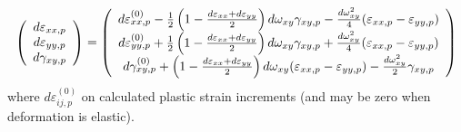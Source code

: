 \documentclass[11pt]{book}
\begin{document}
\begin{equation}
   \left(\begin{array}{c} d\varepsilon_{xx,p} \\ d\varepsilon_{yy,p} \\ d\gamma_{xy,p} \end{array}\right) = 
   \left(\begin{array}{c} d\varepsilon_{xx,p}^{(0)} - {1\over 2}\left(1-{d\varepsilon_{xx}+d\varepsilon_{yy}\over 2}\right)d\omega_{xy}\gamma_{xy,p}
                          - {d\omega_{xy}^2\over 4}(\varepsilon_{xx,p}-\varepsilon_{yy,p}) \\
                d\varepsilon_{yy,p}^{(0)} + {1\over 2}\left(1-{d\varepsilon_{xx}+d\varepsilon_{yy}\over 2}\right)d\omega_{xy}\gamma_{xy,p}
                          + {d\omega_{xy}^2\over 4}(\varepsilon_{xx,p}-\varepsilon_{yy,p}) \\
                d\gamma_{xy,p}^{(0)} + \left(1-{d\varepsilon_{xx}+d\varepsilon_{yy}\over 2}\right)d\omega_{xy}(\varepsilon_{xx,p}-\varepsilon_{yy,p})
                      - {d\omega_{xy}^2\over 2}\gamma_{xy,p} \end{array}\right)
\end{equation}
where $d\varepsilon_{ij,p}^{(0)}$ on calculated plastic strain increments (and may be zero when deformation is elastic).
\end{document}
